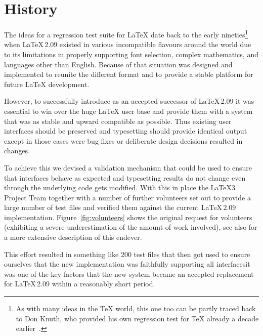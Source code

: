 \documentclass[a4paper]{ltugboat}
\begin{document}
\section{History}

The ideas for a regression test suite for \LaTeX{} date back to the
early nineties\footnote{As with many ideas in the \TeX{} world, this one too
  can be partly traced back to Don Knuth, who provided his own
  regression test for \TeX{} already a decade
  earlier~\cite{Knuth:1984:TTT}.} when \LaTeX\,2.09 existed in various
incompatible flavours around the world due to its limitations in
properly supporting font selection, complex mathematics, and languages
other than English.  Because of that situation \LaTeXe{} was designed
and implemented to reunite the different format and to provide a
stable platform for future \LaTeX{} development.

However, to successfully introduce \LaTeXe{} as an accepted successor
of \LaTeX\,2.09 it was essential to win over the huge \LaTeX{} user
base and provide them with a system that was as stable and upward
compatible as possible. Thus existing user interfaces should be
preserved and typesetting should provide identical output except in
those cases were bug fixes or deliberate design decisions resulted in
changes.

To achieve this we devised a validation mechanism that could be used
to ensure that interfaces behave as expected and typesetting results
do not change even through the underlying code gets modified. With
this in place the \LaTeX3 Project Team together with a number of
further volunteers set out to provide a large number of test files and
verified them against the current \LaTeX\,2.09
implementation. Figure~\ref{fig:volunteers} shows the original request
for volunteers (exhibiting a severe underestimation of the amount of
work involved), see also \cite{Mittelbach:TB18-4-309} for a more extensive
description of this endever. 

This effort resulted in something like 200 test files
that then got used to ensure ourselves that the new \LaTeXe{}
implementation was faithfully supporting all interfaces\Dash it was one
of the key factors that the new system became an accepted replacement
for \LaTeX\,2.09 within a reasonably short period.
\end{document}

